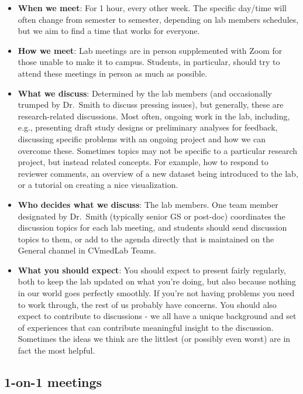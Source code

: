 \documentclass[
  letterpaper,
  DIV=11,
  numbers=noendperiod]{scrreprt}
\begin{document}
\begin{itemize}
\item
  \textbf{When we meet}: For 1 hour, every other week. The specific
  day/time will often change from semester to semester, depending on lab
  members schedules, but we aim to find a time that works for everyone.
\item
  \textbf{How we meet}: Lab meetings are in person supplemented with
  Zoom for those unable to make it to campus. Students, in particular,
  should try to attend these meetings in person as much as possible.
\item
  \textbf{What we discuss}: Determined by the lab members (and
  occasionally trumped by Dr.~Smith to discuss pressing issues), but
  generally, these are research-related discussions. Most often, ongoing
  work in the lab, including, e.g., presenting draft study designs or
  preliminary analyses for feedback, discussing specific problems with
  an ongoing project and how we can overcome these. Sometimes topics may
  not be specific to a particular research project, but instead related
  concepts. For example, how to respond to reviewer comments, an
  overview of a new dataset being introduced to the lab, or a tutorial
  on creating a nice visualization.
\item
  \textbf{Who decides what we discuss}: The lab members. One team member
  designated by Dr.~Smith (typically senior GS or post-doc) coordinates
  the discussion topics for each lab meeting, and students should send
  discussion topics to them, or add to the agenda directly that is
  maintained on the General channel in CVmedLab Teams.
\item
  \textbf{What you should expect}: You should expect to present fairly
  regularly, both to keep the lab updated on what you're doing, but also
  because nothing in our world goes perfectly smoothly. If you're not
  having problems you need to work through, the rest of us probably have
  concerns. You should also expect to contribute to discussions - we all
  have a unique background and set of experiences that can contribute
  meaningful insight to the discussion. Sometimes the ideas we think are
  the littlest (or possibly even worst) are in fact the most helpful.
\end{itemize}

\hypertarget{on-1-meetings}{%
\subsection{1-on-1 meetings}\label{on-1-meetings}}
\end{document}
